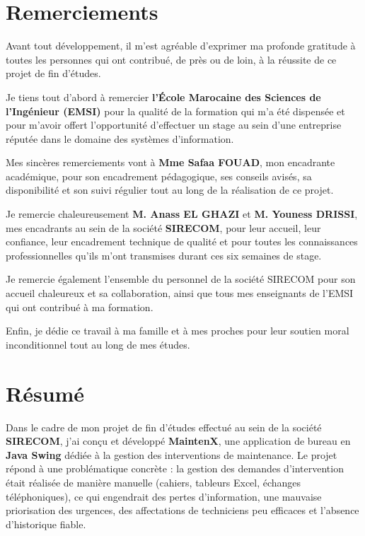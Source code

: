 \documentclass[11pt,a4paper]{report}
\begin{document}
\chapter*{Remerciements}

Avant tout développement, il m'est agréable d'exprimer ma profonde gratitude à toutes les personnes qui ont contribué, de près ou de loin, à la réussite de ce projet de fin d'études.

Je tiens tout d'abord à remercier \textbf{l'École Marocaine des Sciences de l'Ingénieur (EMSI)} pour la qualité de la formation qui m'a été dispensée et pour m'avoir offert l'opportunité d'effectuer un stage au sein d'une entreprise réputée dans le domaine des systèmes d'information.

Mes sincères remerciements vont à \textbf{Mme Safaa FOUAD}, mon encadrante académique, pour son encadrement pédagogique, ses conseils avisés, sa disponibilité et son suivi régulier tout au long de la réalisation de ce projet.

Je remercie chaleureusement \textbf{M. Anass EL GHAZI} et \textbf{M. Youness DRISSI}, mes encadrants au sein de la société \textbf{SIRECOM}, pour leur accueil, leur confiance, leur encadrement technique de qualité et pour toutes les connaissances professionnelles qu'ils m'ont transmises durant ces six semaines de stage.

Je remercie également l'ensemble du personnel de la société SIRECOM pour son accueil chaleureux et sa collaboration, ainsi que tous mes enseignants de l'EMSI qui ont contribué à ma formation.

Enfin, je dédie ce travail à ma famille et à mes proches pour leur soutien moral inconditionnel tout au long de mes études.
\chapter*{Résumé}

Dans le cadre de mon projet de fin d'études effectué au sein de la société \textbf{SIRECOM}, j'ai conçu et développé \textbf{MaintenX}, une application de bureau en \textbf{Java Swing} dédiée à la gestion des interventions de maintenance. Le projet répond à une problématique concrète : la gestion des demandes d'intervention était réalisée de manière manuelle (cahiers, tableurs Excel, échanges téléphoniques), ce qui engendrait des pertes d'information, une mauvaise priorisation des urgences, des affectations de techniciens peu efficaces et l'absence d'historique fiable.
\end{document}
